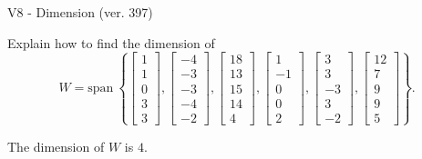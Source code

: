 \begin{exercise}
  \begin{exerciseTitle}V8 - Dimension (ver. 397)\end{exerciseTitle}
  \begin{exerciseStatement}
    Explain how to find the dimension of 
\[W=\mathrm{span}\ \left\{\left[\begin{array}{r}
1 \\
1 \\
0 \\
3 \\
3
\end{array}\right] , \left[\begin{array}{r}
-4 \\
-3 \\
-3 \\
-4 \\
-2
\end{array}\right] , \left[\begin{array}{r}
18 \\
13 \\
15 \\
14 \\
4
\end{array}\right] , \left[\begin{array}{r}
1 \\
-1 \\
0 \\
0 \\
2
\end{array}\right] , \left[\begin{array}{r}
3 \\
3 \\
-3 \\
3 \\
-2
\end{array}\right] , \left[\begin{array}{r}
12 \\
7 \\
9 \\
9 \\
5
\end{array}\right]\right\}.\]



  \end{exerciseStatement}
  \begin{exerciseAnswer}
   The dimension of \(W\) is  \(4\).
  


  \end{exerciseAnswer}
\end{exercise}